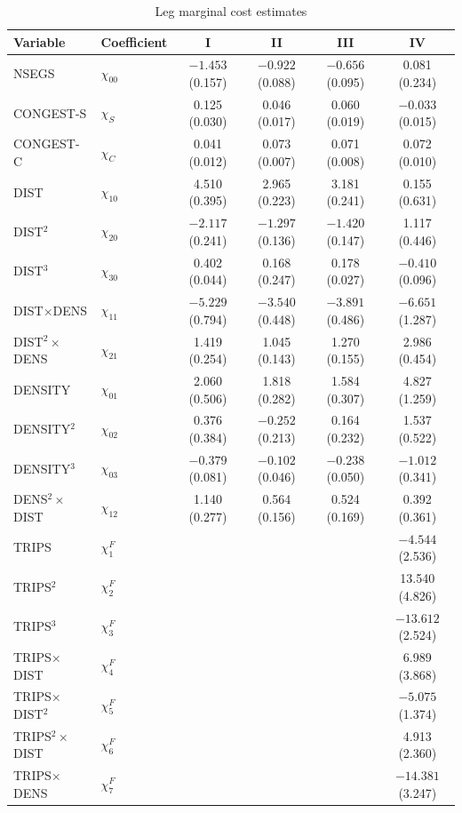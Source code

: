 \begin{table}[htbp]
\centering
\begin{threeparttable}
\caption{Leg marginal cost estimates}
\label{tab:09-bcs-cost}
\footnotesize
\begin{tabular}{@{}llcccc@{}}
\toprule
Variable & Coefficient & I & II & III & IV \\
\midrule
NSEGS & $\chi_{00}$ & $-1.453$ (0.157) & $-0.922$ (0.088) & $-0.656$ (0.095) & 0.081 (0.234) \\
CONGEST-S & $\chi_S$ & 0.125 (0.030) & 0.046 (0.017) & 0.060 (0.019) & $-0.033$ (0.015) \\
CONGEST-C & $\chi_C$ & 0.041 (0.012) & 0.073 (0.007) & 0.071 (0.008) & 0.072 (0.010) \\
DIST & $\chi_{10}$ & 4.510 (0.395) & 2.965 (0.223) & 3.181 (0.241) & 0.155 (0.631) \\
DIST$^2$ & $\chi_{20}$ & $-2.117$ (0.241) & $-1.297$ (0.136) & $-1.420$ (0.147) & 1.117 (0.446) \\
DIST$^3$ & $\chi_{30}$ & 0.402 (0.044) & 0.168 (0.247) & 0.178 (0.027) & $-0.410$ (0.096) \\
DIST$\times$DENS & $\chi_{11}$ & $-5.229$ (0.794) & $-3.540$ (0.448) & $-3.891$ (0.486) & $-6.651$ (1.287) \\
DIST$^2\times$DENS & $\chi_{21}$ & 1.419 (0.254) & 1.045 (0.143) & 1.270 (0.155) & 2.986 (0.454) \\
DENSITY & $\chi_{01}$ & 2.060 (0.506) & 1.818 (0.282) & 1.584 (0.307) & 4.827 (1.259) \\
DENSITY$^2$ & $\chi_{02}$ & 0.376 (0.384) & $-0.252$ (0.213) & 0.164 (0.232) & 1.537 (0.522) \\
DENSITY$^3$ & $\chi_{03}$ & $-0.379$ (0.081) & $-0.102$ (0.046) & $-0.238$ (0.050) & $-1.012$ (0.341) \\
DENS$^2\times$DIST & $\chi_{12}$ & 1.140 (0.277) & 0.564 (0.156) & 0.524 (0.169) & 0.392 (0.361) \\
\addlinespace
TRIPS & $\chi^F_1$ & & & & $-4.544$ (2.536) \\
TRIPS$^2$ & $\chi^F_2$ & & & & 13.540 (4.826) \\
TRIPS$^3$ & $\chi^F_3$ & & & & $-13.612$ (2.524) \\
TRIPS$\times$DIST & $\chi^F_4$ & & & & 6.989 (3.868) \\
TRIPS$\times$DIST$^2$ & $\chi^F_5$ & & & & $-5.075$ (1.374) \\
TRIPS$^2\times$DIST & $\chi^F_6$ & & & & 4.913 (2.360) \\
TRIPS$\times$DENS & $\chi^F_7$ & & & & $-14.381$ (3.247) \\

\end{tabular}
\end{threeparttable}
\end{table}
